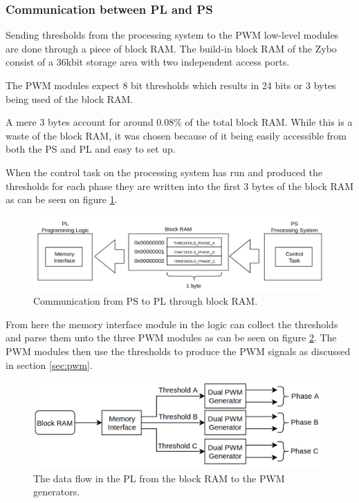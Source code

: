 \subsubsection{Communication between PL and PS}
Sending thresholds from the processing system to the PWM low-level modules are done through a piece of block RAM.
The build-in block RAM of the Zybo consist of a 36kbit storage area with two independent access ports. 

The PWM modules expect 8 bit thresholds which results in 24 bits or 3 bytes being used of the block RAM. 

A mere 3 bytes account for around $0.08\%$ of the total block RAM. While this is a waste of the block RAM, it was chosen because of it being easily accessible from both the PS and PL and easy to set up. 

When the control task on the processing system has run and produced the thresholds for each phase they are written into the first 3 bytes of the block RAM as can be seen on figure \ref{fig:com_pl_to_ps}.

\begin{figure}[H]
	\centering
	\includegraphics[width=1\linewidth]{pictures/software/com_pl_to_ps.png}
	\caption{Communication from PS to PL through block RAM.}
	\label{fig:com_pl_to_ps}
\end{figure}

From here the memory interface module in the logic can collect the thresholds and parse them unto the three PWM modules as can be seen on figure \ref{fig:com_pl}. The PWM modules then use the thresholds to produce the PWM signals as discussed in section \ref{sec:pwm}.


\begin{figure}[H]
	\centering
	\includegraphics[width=0.8\linewidth]{pictures/software/com_pl.png}
	\caption{The data flow in the PL from the block RAM to the PWM generators.}
	\label{fig:com_pl}
\end{figure}



